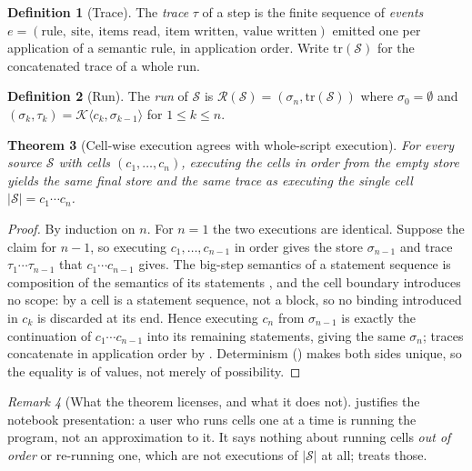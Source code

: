 \documentclass[twocolumn,11pt,a4paper]{article}
\theoremstyle{sup}
\newtheorem{theorem}{Theorem}[section]
\theoremstyle{definition}
\newtheorem{definition}[theorem]{Definition}
\theoremstyle{remark}
\newtheorem{remark}[theorem]{Remark}
\newcommand{\abs}[1]{\lvert#1\rvert}
\newcommand{\Src}{\mathcal{S}}
\newcommand{\Cmp}{\mathcal{K}}
\newcommand{\Run}{\mathcal{R}}
\newcommand{\Tr}{\mathrm{tr}}
\begin{document}
\begin{definition}[Trace]
\label{def:trace}
The \emph{trace} $\tau$ of a step is the finite sequence of \emph{events}
$e=(\text{rule},\ \text{site},\ \text{items read},\ \text{item written},\
\text{value written})$ emitted one per application of a semantic rule, in
application order. Write $\Tr(\Src)$ for the concatenated trace of a whole run.
\end{definition}

\begin{definition}[Run]
\label{def:run}
The \emph{run} of $\Src$ is
$\Run(\Src)=(\sigma_n,\Tr(\Src))$ where $\sigma_0=\emptyset$ and
$(\sigma_k,\tau_k)=\Cmp\langle c_k,\sigma_{k-1}\rangle$ for $1\le k\le n$.
\end{definition}

\begin{theorem}[Cell-wise execution agrees with whole-script execution]
\label{thm:cell-agree}
For every source $\Src$ with cells $(c_1,\dots,c_n)$, executing the cells in
order from the empty store yields the same final store and the same trace as
executing the single cell $\abs{\Src}=c_1\cdots c_n$.
\end{theorem}

\begin{proof}
By induction on $n$. For $n=1$ the two executions are identical. Suppose the
claim for $n-1$, so executing $c_1,\dots,c_{n-1}$ in order gives the store
$\sigma_{n-1}$ and trace $\tau_1\cdots\tau_{n-1}$ that
$c_1\cdots c_{n-1}$ gives. The big-step semantics of a statement sequence is
composition of the semantics of its statements
\citep{plotkin1981,winskel1993}, and the cell boundary introduces no scope: by
\Cref{def:source} a cell is a statement sequence, not a block, so no binding
introduced in $c_k$ is discarded at its end. Hence executing $c_n$ from
$\sigma_{n-1}$ is exactly the continuation of $c_1\cdots c_{n-1}$ into its
remaining statements, giving the same $\sigma_n$; traces concatenate in
application order by \Cref{def:trace}. Determinism (\Cref{ax:det}) makes both
sides unique, so the equality is of values, not merely of possibility.
\end{proof}

\begin{remark}[What the theorem licenses, and what it does not]
\label{rem:cell-agree-scope}
 justifies the notebook presentation: a user who runs
cells one at a time is running the program, not an approximation to it. It says
nothing about running cells \emph{out of order} or re-running one, which are
not executions of $\abs{\Src}$ at all; \Cref{sec:rerun} treats those.
\end{remark}
\end{document}
